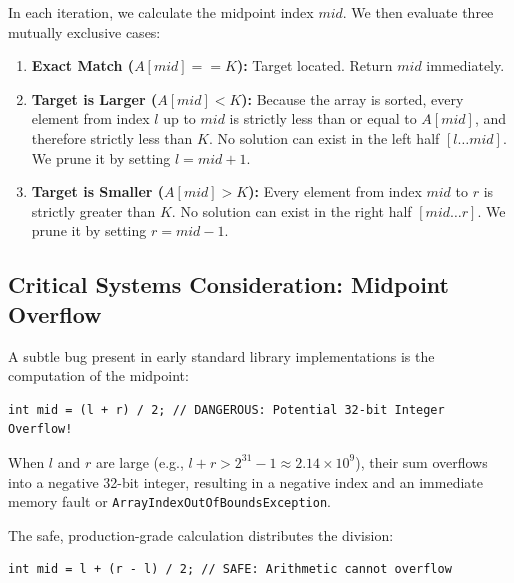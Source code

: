 \documentclass[10pt,journal,compsoc,onecolumn]{IEEEtran}
\begin{document}
In each iteration, we calculate the midpoint index $mid$. We then evaluate three mutually exclusive cases:
\begin{enumerate}
    \item \textbf{Exact Match ($A[mid] == K$):} Target located. Return $mid$ immediately.
    \item \textbf{Target is Larger ($A[mid] < K$):} Because the array is sorted, every element from index $l$ up to $mid$ is strictly less than or equal to $A[mid]$, and therefore strictly less than $K$. No solution can exist in the left half $[l \dots mid]$. We prune it by setting $l = mid + 1$.
    \item \textbf{Target is Smaller ($A[mid] > K$):} Every element from index $mid$ to $r$ is strictly greater than $K$. No solution can exist in the right half $[mid \dots r]$. We prune it by setting $r = mid - 1$.
\end{enumerate}

\subsection{Critical Systems Consideration: Midpoint Overflow}

A subtle bug present in early standard library implementations is the computation of the midpoint:
\begin{verbatim}
int mid = (l + r) / 2; // DANGEROUS: Potential 32-bit Integer Overflow!
\end{verbatim}
When $l$ and $r$ are large (e.g., $l + r > 2^{31} - 1 \approx 2.14 \times 10^9$), their sum overflows into a negative 32-bit integer, resulting in a negative index and an immediate memory fault or \texttt{ArrayIndexOutOfBoundsException}.

The safe, production-grade calculation distributes the division:
\begin{verbatim}
int mid = l + (r - l) / 2; // SAFE: Arithmetic cannot overflow
\end{verbatim}
\end{document}

